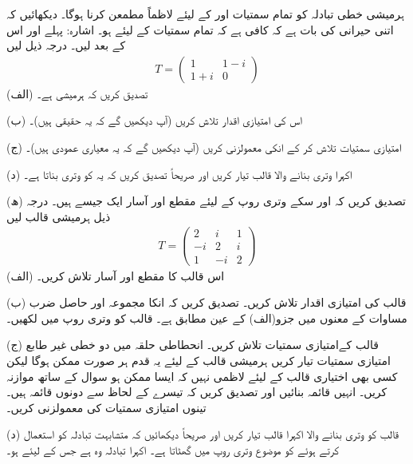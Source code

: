 ہرمیشی خطی تبادلہ کو تمام سمتیات  اور  کے لیئے لاظماً  مطمعن کرنا ہوگا۔ دیکھائیں کہ اتنی حیرانی کی بات ہے کہ کافی ہے کہ تمام سمتیات  کے لیئے  ہو۔ اشارہ: پہلے  اور اس کے بعد  لیں۔ 
درجہ ذیل لیں
\begin{align*}
	T=
	\begin{pmatrix}
		1 & 1-i\\
		1+i & 0
	\end{pmatrix}
\end{align*}
(الف) تصدیق کریں کہ  ہرمیشی ہے۔

(ب) اس کی امتیازی اقدار تلاش کریں (آپ دیکھیں گے کہ یہ حقیقی ہیں)۔

(ج) امتیازی سمتیات تلاش کر کے انکی معمولزنی کریں (آپ دیکھیں گے کہ یہ معیاری عمودی ہیں)۔

(د) اکہرا وتری بنانے والا قالب  تیار کریں اور صریحاً تصدیق کریں کہ یہ  کو وتری بناتا ہے۔

(ھ) تصدیق کریں کہ  اور سکے وتری روپ کے لیئے مقطع  اور آسار  ایک جیسے ہیں۔
درجہ ذیل ہرمیشی قالب لیں
\begin{align*}
	T=
	\begin{pmatrix}
		2 & i & 1\\
		-i & 2 & i\\
		1 & -i & 2
	\end{pmatrix}
\end{align*}
(الف) اس قالب کا مقطع  اور آسار  تلاش کریں۔

(ب) قالب  کی امتیازی اقدار تلاش کریں۔ تصدیق کریں کہ انکا مجموعہ اور حاصل ضرب مساوات  کے معنوں میں جزو(الف) کے عین مطابق ہے۔ قالب  کو وتری روپ میں لکھیں۔

(ج) قالب  کےامتیازی سمتیات تلاش کریں۔ انحطاطی حلقہ میں دو خطی غیر طابع امتیازی سمتیات تیار کریں ہرمیشی قالب کے لیئے یہ قدم ہر صورت ممکن ہوگا لیکن کسی بھی اختیاری قالب کے لیئے لاظمی نہیں کہ ایسا ممکن ہو سوال  کے ساتھ موازنہ کریں۔ انہیں قائمہ بنائیں اور تصدیق کریں کہ تیسرے کے لحاظ سے دونوں قائمہ ہیں۔ تینوں امتیازی سمتیات کی معمولزنی کریں۔

(د) قالب  کو وتری بنانے والا اکہرا قالب  تیار کریں اور صریحاً دیکھائیں کہ متشابہت تبادلہ  کو استعمال کرتے ہوئے  کو موضوع وتری روپ میں گھٹاتا ہے۔
اکہرا تبادلہ وہ ہے جس کے لیئے  ہو۔

